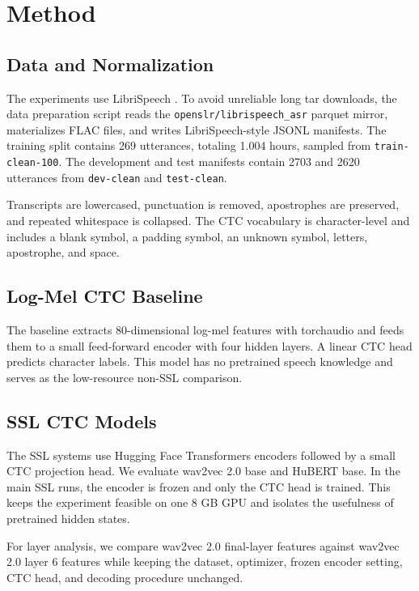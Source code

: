 \documentclass{article}
\begin{document}
\section{Method}

\subsection{Data and Normalization}

The experiments use LibriSpeech \cite{panayotov2015librispeech}. To avoid
unreliable long tar downloads, the data preparation script reads the
\texttt{openslr/librispeech\_asr} parquet mirror, materializes FLAC files, and
writes LibriSpeech-style JSONL manifests. The training split contains 269
utterances, totaling 1.004 hours, sampled from \texttt{train-clean-100}. The
development and test manifests contain 2703 and 2620 utterances from
\texttt{dev-clean} and \texttt{test-clean}.

Transcripts are lowercased, punctuation is removed, apostrophes are preserved,
and repeated whitespace is collapsed. The CTC vocabulary is character-level
and includes a blank symbol, a padding symbol, an unknown symbol, letters,
apostrophe, and space.

\subsection{Log-Mel CTC Baseline}

The baseline extracts 80-dimensional log-mel features with torchaudio and
feeds them to a small feed-forward encoder with four hidden layers. A linear
CTC head predicts character labels. This model has no pretrained speech
knowledge and serves as the low-resource non-SSL comparison.

\subsection{SSL CTC Models}

The SSL systems use Hugging Face Transformers encoders followed by a small CTC
projection head. We evaluate wav2vec 2.0 base and HuBERT base. In the main SSL
runs, the encoder is frozen and only the CTC head is trained. This keeps the
experiment feasible on one 8 GB GPU and isolates the usefulness of pretrained
hidden states.

For layer analysis, we compare wav2vec 2.0 final-layer features against
wav2vec 2.0 layer 6 features while keeping the dataset, optimizer, frozen
encoder setting, CTC head, and decoding procedure unchanged.
\end{document}
